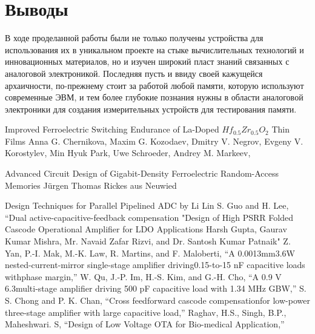 \documentclass[a4paper,12pt]{article} %
\begin{document}
\section{Выводы}

В ходе проделанной работы были не только получены устройства для использования их  в уникальном проекте на стыке вычислительных технологий и инновационных материалов, но и изучен широкий пласт знаний связанных с аналоговой электроникой. Последняя пусть и ввиду своей кажущейся архаичности, по-прежнему стоит за работой любой памяти, которую используют современные ЭВМ, и тем более глубокие познания нужны  в области аналоговой электроники для создания измерительных устройств для тестирования памяти.



\begin{thebibliography}{}
  Improved Ferroelectric Switching Endurance of La-Doped $Hf_{0.5}Zr_{0.5}O_2$
Thin Films
Anna G. Chernikova, Maxim G. Kozodaev, Dmitry V. Negrov, Evgeny V. Korostylev,
Min Hyuk Park, Uwe Schroeder, Andrey M. Markeev,

 Advanced Circuit Design of
Gigabit-Density Ferroelectric
Random-Access Memories Jürgen Thomas Rickes aus Neuwied  


 Design Techniques for Parallel Pipelined ADC  by Li Lin
	S. Guo and H. Lee, “Dual active-capacitive-feedback compensation	
	"Design of High PSRR Folded Cascode Operational Amplifier for LDO Applications
Harsh Gupta, Gaurav Kumar Mishra, Mr. Navaid Zafar Rizvi, and Dr. Santosh Kumar Patnaik"	
 	Z. Yan, P.-I. Mak, M.-K. Law, R. Martins, and F. Maloberti, “A 0.0013mm3.6W nested-current-mirror single-stage amplifier driving0.15-to-15 nF capacitive loads withphase margin,”
	W. Qu, J.-P. Im, H.-S. Kim, and G.-H. Cho, “A 0.9 V 6.3multi-stage amplifier driving 500 pF capacitive load with 1.34 MHz GBW,”	
	S. S. Chong and P. K. Chan, “Cross feedforward cascode compensationfor low-power three-stage amplifier with large capacitive load,”	
	Raghav,  H.S.,  Singh,  B.P.,  Maheshwari.  S,  “Design  of  Low  Voltage  OTA  for  Bio-medical  Application,” 	



\end{thebibliography}
\end{document}
